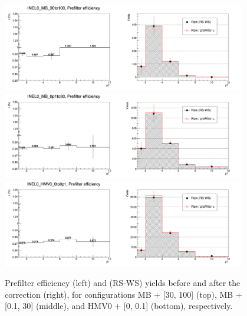 \begin{appendix}
\begin{figure}[h]
    \centering
    \includegraphics[width=0.95\textwidth]{plots/s2_preFCorr_INEL0_MB_30to100.png} \\\vspace{5pt}
    \includegraphics[width=0.95\textwidth]{plots/s2_preFCorr_INEL0_MB_0p1to30.png} \\\vspace{5pt}
    \includegraphics[width=0.95\textwidth]{plots/s2_preFCorr_INEL0_HMV0_0to0p1.png}
    \caption{Prefilter efficiency (left) and (RS-WS) yields before and after the correction (right), for configurations MB + [30, 100] (top), MB + [0.1, 30] (middle), and HMV0 + [0, 0.1] (bottom), respectively.}
    \label{fig:appB_preF}
\end{figure}
\clearpage


\end{appendix}
